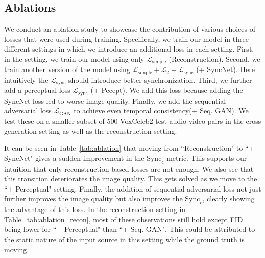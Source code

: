 \subsection{Ablations}
We conduct an ablation study to showcase the contribution of various choices of losses that were used during training. Specifically, we train our model in three different settings in which we introduce an additional loss in each setting. First, in the setting, we train our model using only $\mathcal{L}_\text{simple}$ (Reconstruction). Second, we train another version of the model 
 using $\mathcal{L}_\text{simple}+\mathcal{L}_{2}+\mathcal{L}_\text{sync}$ (+ SyncNet). Here intuitively the $\mathcal{L}_\text{sync}$ should introduce better synchronization. Third, we further add a perceptual loss $\mathcal{L}_\text{sync}$ (+ Pecept). We add this loss because adding the SyncNet loss led to worse image quality. Finally, we add the sequential adversarial loss $\mathcal{L}_\text{GAN}$ to achieve even temporal consistency(+ Seq. GAN). We test these on a smaller subset of 500 VoxCeleb2 test audio-video pairs in the cross generation setting as well as the reconstruction setting. 
 
It can be seen in Table~\ref{tab:ablation} that moving from ``Reconstruction" to ``+ SyncNet" gives a sudden improvement in the $\text{Sync}_\text{c}$ metric. This supports our intuition that only reconstruction-based losses are not enough. We also see that this transition deteriorates the image quality. This gets solved as we move to the ``+ Perceptual" setting. Finally, the addition of sequential adversarial loss not just further improves the image quality but also improves the $\text{Sync}_c$, clearly showing the advantage of this loss.  In the reconstruction setting in Table~\ref{tab:ablation_recon}, most of these observations still hold except FID being lower for ``+ Perceptual" than ``+ Seq. GAN". This could be attributed to the static nature of the input source in this setting while the ground truth is moving.  


